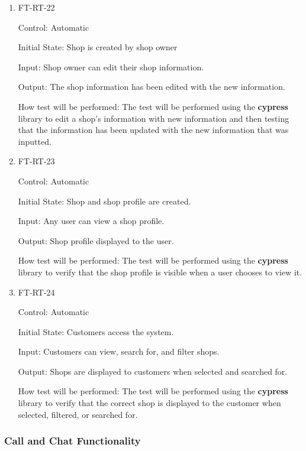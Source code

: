 \documentclass[12pt, titlepage]{article}
\begin{document}
\begin{enumerate}

\item{FT-RT-22\\}

Control: Automatic
					
Initial State: Shop is created by shop owner
					
Input: Shop owner can edit their shop information.
					
Output: The shop information has been edited with the new information.

How test will be performed: The test will be performed using the \textbf{cypress} library to edit a shop's information with new information and then testing that the information has been updated with the new information that was inputted.

\item{FT-RT-23\\}

Control: Automatic

Initial State: Shop and shop profile are created.

Input: Any user can view a shop profile.

Output: Shop profile displayed to the user.

How test will be performed: The test will be performed using the \textbf{cypress} library to verify that the shop profile is visible when a user chooses to view it.

\item{FT-RT-24\\}

Control: Automatic

Initial State: Customers access the system.

Input: Customers can view, search for, and filter shops.

Output: Shops are displayed to customers when selected and searched for.

How test will be performed: The test will be performed using the \textbf{cypress} library to verify that the correct shop is displayed to the customer when selected, filtered, or searched for.

\end{enumerate}

\subsubsection{Call and Chat Functionality}
\end{document}
